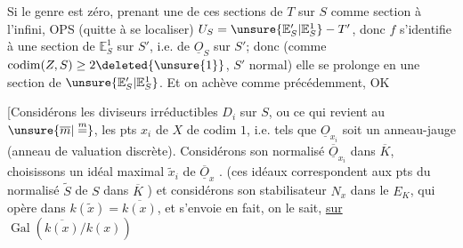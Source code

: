Si le genre est zéro, prenant une de ces sections de $T$ sur $S$ comme section à l'infini, OPS (quitte à se localiser) $U_S=\unsure{\mathbb E'_S|\mathbb E^1_S}-T'$, donc $f$ s'identifie à une section de $\mathbb E^1_S$ sur $S'$, i.e. de $\underline O_S$ sur $S'$; donc (comme $\operatorname{codim}(Z,S)\geq2\deleted{\unsure{1}}$, $S'$ normal) elle se prolonge en une section de $\unsure{\mathbb E'_S|\mathbb E^1_S}$. Et on achève comme précédemment, OK

[Considérons  les diviseurs irréductibles $D_i$ sur $S$, ou ce qui revient au $\unsure{\overline m|\overset{m}{=}}$, les pts $x_i$ de $X$ de codim $1$, i.e. tels que $\underline O_{x_i}$ soit un anneau-jauge (anneau de valuation discrète). Considérons son normalisé $\overline{\underline O}_{x_i}$ dans $\overline K$, choisissons un idéal maximal $\widetilde x_i$ de $\overline{\underline O}_x$ . (ces idéaux correspondent aux pts du normalisé $\widetilde S$ de $S$ dans $\overline K$ ) et considérons son stabilisateur $N_x$ dans le $E_K$, qui opère  dans $k(\widetilde x)=\overline{k(x)}$, et s'envoie en fait, on le sait, \uline{sur} $\operatorname{Gal}(\overline{k(x)}/k(x))$
